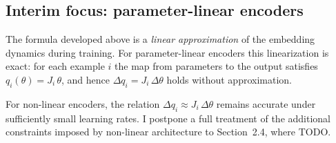 \subsection{Interim focus: parameter-linear encoders}

The formula developed above is a \emph{linear approximation} of the embedding dynamics during training. For parameter-linear encoders this linearization is exact: for each example $i$ the map from parameters to the output satisfies $q_i(\theta)=J_i\,\theta$, and hence $\Delta q_i = J_i\,\Delta\theta$ holds without approximation.

For non-linear encoders, the relation $\Delta q_i \approx J_i\,\Delta\theta$ remains accurate under sufficiently small learning rates. I postpone a full treatment of the additional constraints imposed by non-linear architecture to Section~2.4, where TODO.

